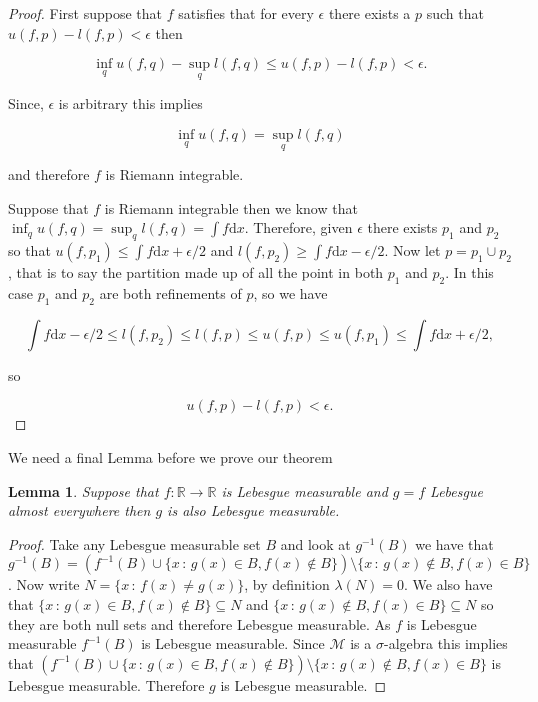 \documentclass[
]{book}
\newtheorem{lemma}{Lemma}[chapter]
\theoremstyle{definition}
\theoremstyle{definition}
\theoremstyle{definition}
\theoremstyle{definition}
\theoremstyle{remark}
\begin{document}
\begin{proof}
First suppose that \(f\) satisfies that for every \(\epsilon\) there exists a \(p\) such that \(u(f,p)-l(f,p) < \epsilon\) then

\[ \inf_q u(f,q) - \sup_q l(f,q) \leq u(f,p)-l(f,p) < \epsilon. \]

Since, \(\epsilon\) is arbitrary this implies

\[ \inf_q u(f,q) = \sup_q l(f,q) \]

and therefore \(f\) is Riemann integrable.

Suppose that \(f\) is Riemann integrable then we know that \(\inf_q u(f,q) = \sup_q l(f,q) = \int f \mathrm{d}x\). Therefore, given \(\epsilon\) there exists \(p_1\) and \(p_2\) so that \(u(f,p_1) \leq \int f \mathrm{d}x + \epsilon/2\) and \(l(f,p_2) \geq \int f \mathrm{d}x - \epsilon/2\). Now let \(p = p_1 \cup p_2\), that is to say the partition made up of all the point in both \(p_1\) and \(p_2\). In this case \(p_1\) and \(p_2\) are both refinements of \(p\), so we have

\[ \int f \mathrm{d}x - \epsilon/2 \leq l(f,p_2) \leq l(f,p) \leq u(f,p) \leq u(f,p_1) \leq \int f \mathrm{d}x + \epsilon/2, \]

so

\[ u(f,p)-l(f,p) < \epsilon. \]
\end{proof}

We need a final Lemma before we prove our theorem

\begin{lemma}
Suppose that \(f: \mathbb{R} \rightarrow \mathbb{R}\) is Lebesgue measurable and \(g = f\) Lebesgue almost everywhere then \(g\) is also Lebesgue measurable.
\end{lemma}

\begin{proof}
Take any Lebesgue measurable set \(B\) and look at \(g^{-1}(B)\) we have that \(g^{-1}(B) = (f^{-1}(B) \cup \{ x\,:\, g(x) \in B, f(x) \notin B\}) \setminus \{ x \, :\, g(x) \notin B, f(x) \in B\}\). Now write \(N = \{ x \,:\, f(x) \neq g(x)\}\), by definition \(\lambda(N) = 0\). We also have that \(\{ x \,:\, g(x) \in B, f(x) \notin B\} \subseteq N\) and \(\{x\,:\, g(x) \notin B, f(x) \in B\} \subseteq N\) so they are both null sets and therefore Lebesgue measurable. As \(f\) is Lebesgue measurable \(f^{-1}(B)\) is Lebesgue measurable. Since \(\mathscr{M}\) is a \(\sigma\)-algebra this implies that \((f^{-1}(B) \cup \{ x\,:\, g(x) \in B, f(x) \notin B\}) \setminus \{ x \, :\, g(x) \notin B, f(x) \in B\}\) is Lebesgue measurable. Therefore \(g\) is Lebesgue measurable.
\end{proof}
\end{document}
